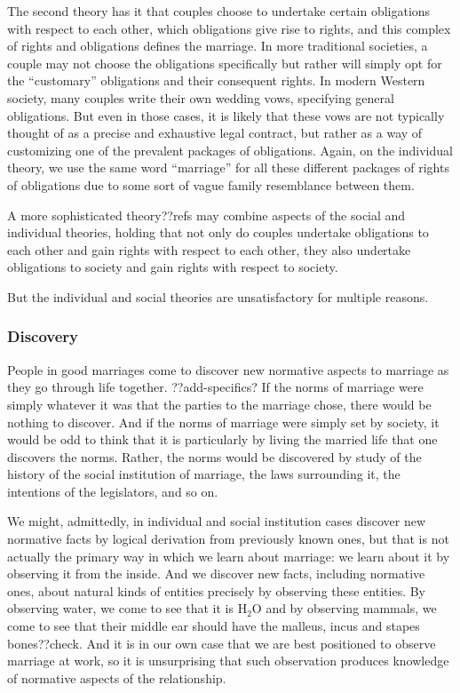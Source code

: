 The second theory has it that couples choose to undertake certain obligations with respect to each other, which obligations give rise to rights,
and this complex of rights and obligations defines the marriage. In more traditional societies, a couple may not choose the obligations specifically 
but rather will simply opt for the ``customary'' obligations and their consequent rights. In modern Western society, many couples write their own 
wedding vows, specifying general obligations. But even in those cases, it is likely that these vows are not typically thought of as a precise and exhaustive
legal contract, but rather as a way of customizing one of the prevalent packages of obligations. Again, on the individual theory, we use the same word 
``marriage'' for all these different packages of rights of obligations due to some sort of vague family resemblance between them. 

A more sophisticated theory??refs may combine aspects of the social and individual theories, holding that not only do couples undertake obligations to each other and gain
rights with respect to each other, they also undertake obligations to society and gain rights with respect to society. 

But the individual and social theories are unsatisfactory for multiple reasons.

\subsubsection{Discovery}
People in good marriages come to discover new normative aspects to marriage as they go through life together. ??add-specifics?
If the norms of marriage were simply whatever it was that the parties to the marriage chose, there would be nothing to discover.
And if the norms of marriage were simply set by society, it would be odd to think that it is particularly by living the married life that
one discovers the norms. Rather, the norms would be discovered by study of the history of the social institution of marriage,
the laws surrounding it, the intentions of the legislators, and so on. 

We might, admittedly, in individual and social institution cases discover
new normative facts by logical derivation from previously known ones, but that is not actually the primary way in which we learn about marriage:
we learn about it by observing it from the inside. 
And we discover new facts, including normative ones, about natural kinds of entities precisely by observing these entities. By observing water,
we come to see that it is H$_2$O and by observing mammals, we come to see that their middle ear should have the malleus, incus and stapes bones??check. And
it is in our own case that we are best positioned to observe marriage at work, so it is unsurprising that such observation produces knowledge of normative
aspects of the relationship. 

